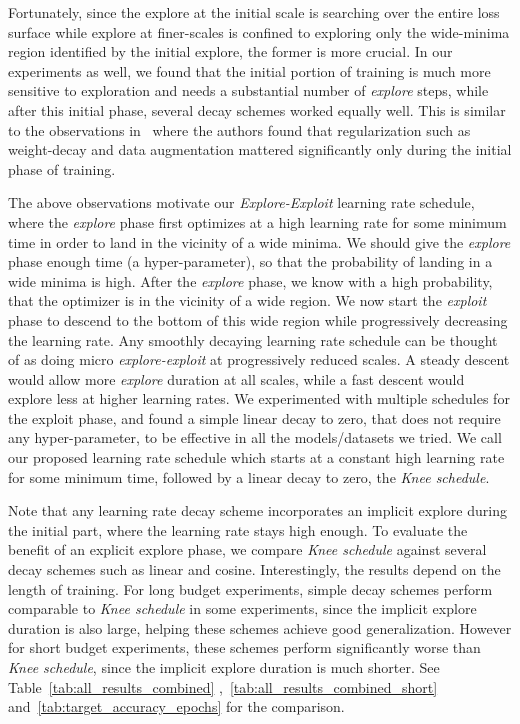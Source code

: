 \documentclass[twoside,11pt]{article}
\newcommand{\lrschedule}{\textit{Knee schedule}}
\begin{document}
Fortunately, since the explore at the initial scale is searching over the entire loss surface while explore at finer-scales is confined to exploring only the wide-minima region identified by the initial explore, the former is more crucial. In our experiments as well, we found that the initial portion of training is much more sensitive to exploration and needs a substantial number of \textit{explore} steps, while after this initial phase, several decay schemes worked equally well. This is similar to the observations in~\citep{golatkar2019time} where the authors found that regularization such as weight-decay and data augmentation mattered significantly only during the initial phase of training.

The above observations motivate our {\it Explore-Exploit} learning rate schedule, where the \textit{explore} phase first optimizes at a high learning rate for some minimum time in order to land in the vicinity of a wide minima. We should give the \textit{explore} phase enough time (a hyper-parameter), so that the probability of landing in a wide minima is high.
After the \textit{explore} phase, we know with a high probability, that the optimizer is in the vicinity of a wide region. We now start the {\it exploit} phase to descend to the bottom of this wide region while progressively decreasing the learning rate. Any smoothly decaying learning rate schedule can be thought of as doing micro \textit{explore-exploit} at progressively reduced scales. A steady descent would allow more \textit{explore} duration at all scales, while a fast descent would explore less at higher learning rates. We experimented with multiple schedules for the exploit phase, and found a simple linear decay to zero, that does not require any hyper-parameter, to be effective in all the models/datasets we tried. We call our proposed learning rate schedule which starts at a constant high learning rate for some minimum time, followed by a linear decay to zero, the \lrschedule{}.

Note that any learning rate decay scheme incorporates an implicit explore during the initial part, where the learning rate stays high enough. To evaluate the benefit of an explicit explore phase, we compare \lrschedule{} against several decay schemes such as linear and cosine. Interestingly, the results depend on the length of training. For long budget experiments, simple decay schemes perform comparable to \lrschedule{} in some experiments, since the implicit explore duration is also large, helping these schemes achieve good generalization. However for short budget experiments, these schemes perform significantly worse than \lrschedule{}, since the implicit explore duration is much shorter. See Table~\ref{tab:all_results_combined} ,~\ref{tab:all_results_combined_short} and~\ref{tab:target_accuracy_epochs} for the comparison.
\end{document}
